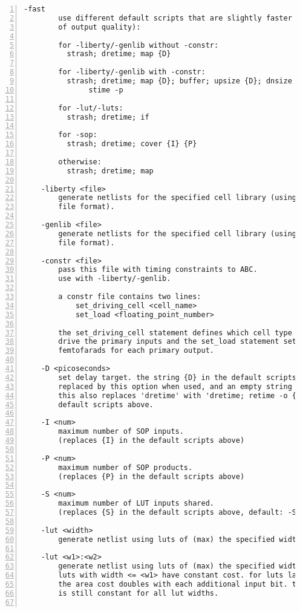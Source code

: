 \begin{lstlisting}[numbers=left,frame=single]
    -fast
        use different default scripts that are slightly faster (at the cost
        of output quality):

        for -liberty/-genlib without -constr:
          strash; dretime; map {D}

        for -liberty/-genlib with -constr:
          strash; dretime; map {D}; buffer; upsize {D}; dnsize {D};
               stime -p

        for -lut/-luts:
          strash; dretime; if

        for -sop:
          strash; dretime; cover {I} {P}

        otherwise:
          strash; dretime; map

    -liberty <file>
        generate netlists for the specified cell library (using the liberty
        file format).

    -genlib <file>
        generate netlists for the specified cell library (using the SIS Genlib
        file format).

    -constr <file>
        pass this file with timing constraints to ABC.
        use with -liberty/-genlib.

        a constr file contains two lines:
            set_driving_cell <cell_name>
            set_load <floating_point_number>

        the set_driving_cell statement defines which cell type is assumed to
        drive the primary inputs and the set_load statement sets the load in
        femtofarads for each primary output.

    -D <picoseconds>
        set delay target. the string {D} in the default scripts above is
        replaced by this option when used, and an empty string otherwise.
        this also replaces 'dretime' with 'dretime; retime -o {D}' in the
        default scripts above.

    -I <num>
        maximum number of SOP inputs.
        (replaces {I} in the default scripts above)

    -P <num>
        maximum number of SOP products.
        (replaces {P} in the default scripts above)

    -S <num>
        maximum number of LUT inputs shared.
        (replaces {S} in the default scripts above, default: -S 1)

    -lut <width>
        generate netlist using luts of (max) the specified width.

    -lut <w1>:<w2>
        generate netlist using luts of (max) the specified width <w2>. All
        luts with width <= <w1> have constant cost. for luts larger than <w1>
        the area cost doubles with each additional input bit. the delay cost
        is still constant for all lut widths.


\end{lstlisting}
